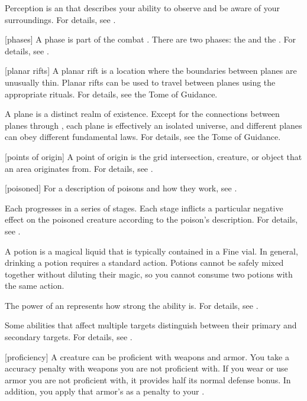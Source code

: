  Perception is an  that describes your ability to observe and be aware of your surroundings.
For details, see .

[phases] A phase is part of the combat .
There are two phases: the  and the .
For details, see .

[planar rifts] A planar rift is a location where the boundaries between planes are unusually thin.
Planar rifts can be used to travel between planes using the appropriate rituals.
For details, see the Tome of Guidance.

 A plane is a distinct realm of existence.
Except for the connections between planes through , each plane is effectively an isolated universe, and different planes can obey different fundamental laws.
For details, see the Tome of Guidance.

[points of origin] A point of origin is the grid intersection, creature, or object that an area originates from.
For details, see .

[poisoned] For a description of poisons and how they work, see .

 Each  progresses in a series of stages.
Each stage inflicts a particular negative effect on the poisoned creature according to the poison's description.
For details, see .

 A potion is a magical liquid that is typically contained in a Fine vial.
In general, drinking a potion requires a standard action.
Potions cannot be safely mixed together without diluting their magic, so you cannot consume two potions with the same action.

 The power of an  represents how strong the ability is.
For details, see .

 Some abilities that affect multiple targets distinguish between their primary and secondary targets.
For details, see .

[proficiency] A creature can be proficient with weapons and armor.
You take a  accuracy penalty with weapons you are not proficient with.
If you wear or use armor you are not proficient with, it provides half its normal defense bonus.
In addition, you apply that armor's  as a penalty to your .

